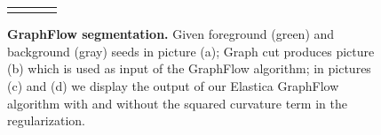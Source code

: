 \documentclass[runningheads]{llncs}
\begin{document}
\begin{figure}
\begin{tabular}{cccc}
}
\end{tabular}	
\caption{\textbf{GraphFlow segmentation.} Given foreground (green) and background (gray) seeds in picture (a); Graph cut
  produces picture (b) which is used as input of the GraphFlow algorithm; in pictures (c) and (d) we display the output
  of our Elastica GraphFlow algorithm with and without the squared curvature term in the regularization. }
\label{ch8:fig:segmentation}
\end{figure}
\end{document}
